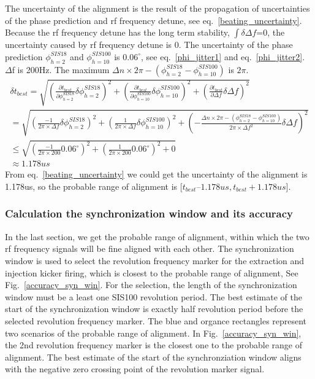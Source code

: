 The uncertainty of the alignment is the result of the propagation of uncertainties of the phase prediction and rf frequency detune, see eq.~\ref{beating_uncertainty}. Because the rf frequency detune has the long term stability, $\int\delta \Delta f$=0, the uncertainty caused by rf frequency detune is 0. The uncertainty of the phase prediction $\phi_{h=2}^{SIS18}$ and $\phi_{h=10}^{SIS100}$ is $0.06^\circ$, see eq.~\ref{phi_jitter1} and eq.~\ref{phi_jitter2}. $\Delta$f is 200Hz. The maximum ${\Delta n} \times {2\pi} - (\phi_{h=2}^{SIS18}-\phi_{h=10}^{SIS100})$ is $2\pi$.
\begin{equation}
\begin{aligned}
\delta t_{best} =\sqrt {(\frac {\partial t_{best}}{\partial \phi_{h=2}^{SIS18}}\delta \phi_{h=2}^{SIS18})^2 + (\frac {\partial t_{best}}{\partial \phi_{h=10}^{SIS100}}\delta \phi_{h=10}^{SIS100})^2+(\frac {\partial t_{best}}{\partial \Delta f}\delta \Delta f)^2} \\
 =\sqrt {(\frac{-1}{{2\pi} \times {\Delta f}}\delta \phi_{h=2}^{SIS18})^2+(\frac{1}{{2\pi} \times {\Delta f}}\delta \phi_{h=10}^{SIS100})^2+(-\frac{{\Delta n} \times {2\pi} - (\phi_{h=2}^{SIS18}-\phi_{h=10}^{SIS100})}{{2\pi} \times {\Delta f}^2}\delta \Delta f)^2} \\
\le \sqrt {(\frac{-1}{{2\pi} \times {200}}0.06^\circ)^2+(\frac{1}{{2\pi} \times {200}}0.06^\circ)^2+0}\\
\approx 1.178us \label{beating_uncertainty}
\end{aligned}
\end{equation}
From eq.~\ref{beating_uncertainty} we could get the uncertainty of the alignment is 1.178us, so the probable range of alignment is [$t_{best} – 1.178us, t_{best}+ 1.178us$].
\subsubsection{Calculation the synchronization window and its accuracy}
In the last section, we get the probable range of alignment, within which the two rf frequency signals will be fine aligned with each other. The synchronization window is used to select the revolution frequency marker for the extraction and injection kicker firing, which is closest to the probable range of alignment, See Fig.~\ref{accuracy_syn_win}. For the selection, the length of the synchronization window must be a least one SIS100 revolution period. The best estimate of the start of the synchronization window is exactly half revolution period before the selected revolution frequency marker. The blue and organce rectangles represent two scenarios of the probable range of alignment. In Fig.~\ref{accuracy_syn_win}, the 2nd revolution frequency marker is the closest one to the probable range of alignment. The best estimate of the start of the synchronziation window aligns with the negative zero crossing point of the revolution marker signal.

